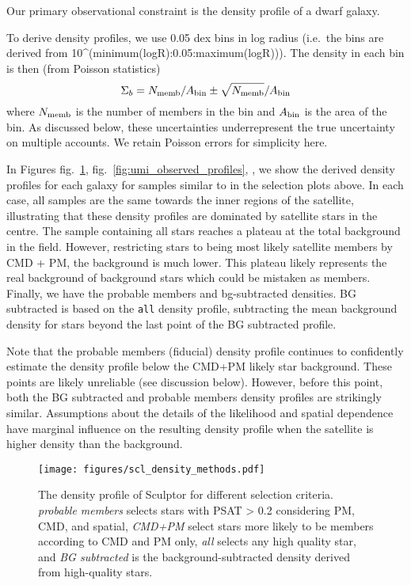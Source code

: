 Our primary observational constraint is the density profile of a dwarf
galaxy.

To derive density profiles, we use 0.05 dex bins in log radius (i.e.~the
bins are derived from 10\^{}(minimum(logR):0.05:maximum(logR))). The
density in each bin is then (from Poisson statistics) \[
\Sigma_b = N_{\rm memb} / A_{\rm bin} \pm \sqrt{N_{\rm memb}} / A_{\rm bin}
\] where \(N_{\rm memb}\) is the number of members in the bin and
\(A_{\rm bin}\) is the area of the bin. As discussed below, these
uncertainties underrepresent the true uncertainty on multiple accounts.
We retain Poisson errors for simplicity here.

In Figures fig.~\ref{fig:scl_observed_profiles},
fig.~\ref{fig:umi_observed_profiles},
\citet{fig_fornax_observed_profiles}, we show the derived density
profiles for each galaxy for samples similar to in the selection plots
above. In each case, all samples are the same towards the inner regions
of the satellite, illustrating that these density profiles are dominated
by satellite stars in the centre. The sample containing all stars
reaches a plateau at the total background in the field. However,
restricting stars to being most likely satellite members by CMD + PM,
the background is much lower. This plateau likely represents the real
background of background stars which could be mistaken as members.
Finally, we have the probable members and bg-subtracted densities. BG
subtracted is based on the \texttt{all} density profile, subtracting the
mean background density for stars beyond the last point of the BG
subtracted profile.

Note that the probable members (fiducial) density profile continues to
confidently estimate the density profile below the CMD+PM likely star
background. These points are likely unreliable (see discussion below).
However, before this point, both the BG subtracted and probable members
density profiles are strikingly similar. Assumptions about the details
of the likelihood and spatial dependence have marginal influence on the
resulting density profile when the satellite is higher density than the
background.

\begin{figure}
\centering
\texttt{[image: figures/scl\_density\_methods.pdf]}
\caption[Sculptor density profiles]{The density profile of Sculptor for
different selection criteria. \emph{probable members} selects stars with
PSAT \textgreater{} 0.2 considering PM, CMD, and spatial, \emph{CMD+PM}
select stars more likely to be members according to CMD and PM only,
\emph{all} selects any high quality star, and \emph{BG subtracted} is
the background-subtracted density derived from high-quality
stars.}\label{fig:scl_observed_profiles}
\end{figure}

